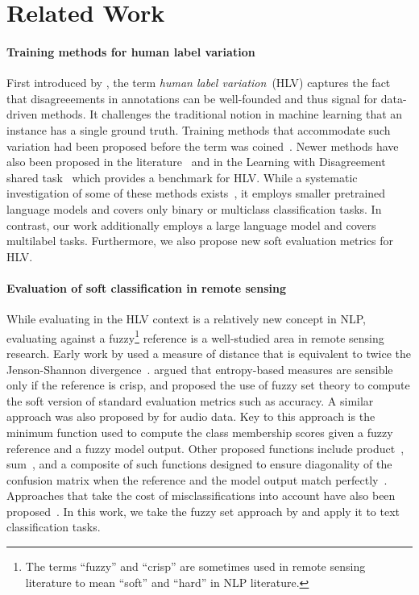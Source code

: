 \section{Related Work}
\label{sec:related-work}

\paragraph{Training methods for human label variation}

First introduced by \citet{plank2022}, the term \textit{human label
  variation}~(HLV) captures the fact that disagreeements in annotations can be
well-founded and thus signal for data-driven methods. It challenges the
traditional notion in machine learning that an instance has a single ground
truth. Training methods that accommodate such variation had been proposed before
the term was coined~\citep[\textit{inter alia}]{sheng2008,peterson2019,uma2020}.
Newer methods have also been proposed in the
literature~\citep{deng2023,lee2023,chen2024,rodriguez-barroso2024} and in the
Learning with Disagreement shared task~\citep{leonardelli2023} which provides a
benchmark for HLV. While a systematic investigation of some of these methods
exists~\citep{uma2020}, it employs smaller pretrained language models and covers
only binary or multiclass classification tasks. In contrast, our work
additionally employs a large language model and covers multilabel tasks.
Furthermore, we also propose new soft evaluation metrics for HLV.

\paragraph{Evaluation of soft classification in remote sensing}

While evaluating in the HLV context is a relatively new concept in NLP,
evaluating against a fuzzy\footnote{The terms ``fuzzy'' and ``crisp'' are sometimes
  used in remote sensing literature to mean ``soft'' and ``hard'' in NLP
  literature.} reference is a well-studied area in remote sensing research.
Early work by \citet{foody1996} used a measure of distance that is equivalent to
twice the Jenson-Shannon divergence~\citep{lin1991}. \citet{binaghi1999} argued
that entropy-based measures are sensible only if the reference is crisp, and
proposed the use of fuzzy set theory to compute the soft version of standard
evaluation metrics such as accuracy. A similar approach was also proposed by
\citet{harju2023} for audio data. Key to this approach is the minimum function
used to compute the class membership scores given a fuzzy reference and a fuzzy
model output. Other proposed functions include product~\citep{lewis2001},
sum~\citep{pontius2006a}, and a composite of such functions designed to ensure
diagonality of the confusion matrix when the reference and the model output
match perfectly~\citep{pontius2006,silvan-cardenas2008}. Approaches that take
the cost of misclassifications into account have also been
proposed~\citep{gomez2008}. In this work, we take the fuzzy set approach by
\citet{binaghi1999} and apply it to text classification tasks.